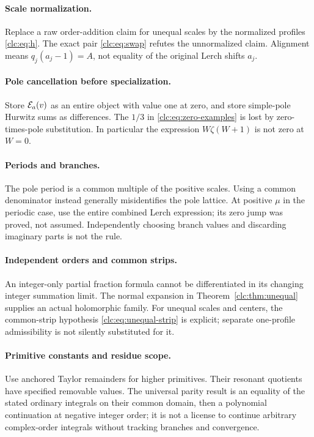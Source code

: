 \paragraph{Scale normalization.}
Replace a raw order-addition claim for unequal scales by the normalized
profiles \eqref{clc:eq:h}. The exact pair \eqref{clc:eq:swap} refutes the
unnormalized claim. Alignment means $q_j(a_j-1)=A$, not equality of the
original Lerch shifts $a_j$.

\paragraph{Pole cancellation before specialization.}
Store $\mathcal E_a(v)$ as an entire object with value one at zero, and store
simple-pole Hurwitz sums as differences. The $1/3$ in
\eqref{clc:eq:zero-examples} is lost by zero-times-pole substitution.
In particular the expression $W\zeta(W+1)$ is not zero at $W=0$.

\paragraph{Periods and branches.}
The pole period is a common multiple of the positive scales.
Using a common denominator instead generally misidentifies the pole
lattice. At positive $\mu$ in the periodic case, use the entire combined
Lerch expression; its zero jump was proved, not assumed. Independently
choosing branch values and discarding imaginary parts is not the rule.

\paragraph{Independent orders and common strips.}
An integer-only partial fraction formula cannot be differentiated in
its changing integer summation limit. The normal expansion in
Theorem~\ref{clc:thm:unequal} supplies an actual holomorphic family.
For unequal scales and centers, the common-strip hypothesis
\eqref{clc:eq:unequal-strip} is explicit; separate one-profile
admissibility is not silently substituted for it.

\paragraph{Primitive constants and residue scope.}
Use anchored Taylor remainders for higher primitives. Their resonant
quotients have specified removable values. The universal parity result
is an equality of the stated ordinary integrals on their common domain,
then a polynomial continuation at negative integer order; it is not a
license to continue arbitrary complex-order integrals without tracking
branches and convergence.

